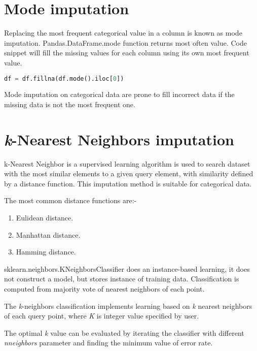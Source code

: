 \section{Mode imputation}

Replacing the most frequent categorical value in a column is known as mode imputation.  Pandas.DataFrame.mode \parencite{mckinney-proc-scipy-2010} function returns most often value. Code snippet will fill the missing values for each column using its own most frequent value.

\begin{lstlisting}[language=Python]
    df = df.fillna(df.mode().iloc[0])
\end{lstlisting}

Mode imputation on categorical data are prone to fill incorrect data if the missing data is not the most frequent one.



\section{\textit{k}-Nearest Neighbors imputation}

k-Nearest Neighbor is a supervised learning algorithm is used to search dataset with the most similar elements to a given query element, with similarity defined by a distance function. This imputation method is suitable for categorical data.

The most common distance functions are:-

\begin{enumerate}
    \item Eulidean distance.
    \item Manhattan distance.
    \item Hamming distance.
\end{enumerate}

sklearn.neighbors.KNeighborsClassifier \parencite{scikit-learn} does an instance-based learning, it does not construct a model, but stores instance of training data. Classification is computed from majority vote of nearest neighbors of each point.

The \textit{k}-neighbors classification implements learning based on  \textit{k} nearest neighbors of each query point, where \textit{K} is integer value specified by user.

The optimal \textit{k} value can be evaluated by iterating the classifier with different  \textit{n\textunderscore neighbors} parameter and finding the minimum value of error rate.

